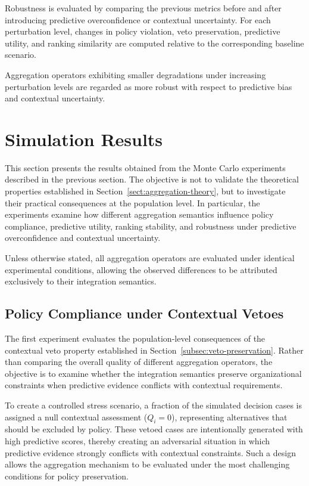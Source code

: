 \documentclass[mathematics,article,submit,moreauthors]{Definitions/mdpi}
\begin{document}
Robustness is evaluated by comparing the previous metrics before and
after introducing predictive overconfidence or contextual uncertainty.
For each perturbation level, changes in policy violation, veto
preservation, predictive utility, and ranking similarity are
computed relative to the corresponding baseline scenario.

Aggregation operators exhibiting smaller degradations under increasing
perturbation levels are regarded as more robust with respect to
predictive bias and contextual uncertainty.




\section{Simulation Results}
\label{sec:simulation-results}
This section presents the results obtained from the Monte Carlo
experiments described in the previous section. The objective is not to
validate the theoretical properties established in
Section~\ref{sect:aggregation-theory}, but to investigate their
practical consequences at the population level. In particular, the
experiments examine how different aggregation semantics influence
policy compliance, predictive utility, ranking stability, and robustness
under predictive overconfidence and contextual uncertainty.

Unless otherwise stated, all aggregation operators are evaluated under
identical experimental conditions, allowing the observed differences to
be attributed exclusively to their integration semantics.


\subsection{Policy Compliance under Contextual Vetoes}
\label{subsec:simulation-policy-compliance}

The first experiment evaluates the population-level consequences of the
contextual veto property established in
Section~\ref{subsec:veto-preservation}. Rather than comparing the overall
quality of different aggregation operators, the objective is to examine
whether the integration semantics preserve organizational constraints
when predictive evidence conflicts with contextual requirements.

To create a controlled stress scenario, a fraction of the simulated
decision cases is assigned a null contextual assessment
($Q_i=0$), representing alternatives that should be excluded by policy.
These vetoed cases are intentionally generated with high predictive
scores, thereby creating an adversarial situation in which predictive
evidence strongly conflicts with contextual constraints. Such a design
allows the aggregation mechanism to be evaluated under the most
challenging conditions for policy preservation.
\end{document}
